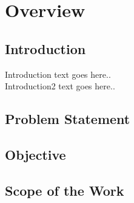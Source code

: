 \chapter{Overview}\label{ch:overview}
\section{Introduction}
Introduction text goes here..
\\
Introduction2 text goes here..
\section{Problem Statement}
\section{Objective}
\section{Scope of the Work}

